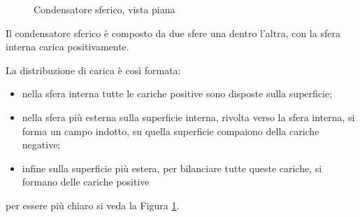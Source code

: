 \begin{figure}[H]
    \centering
    \caption{Condensatore sferico, vista piana}
    \label{fig:conSfera}
\end{figure}

Il condensatore sferico è composto da due sfere una dentro l'altra, con la sfera interna carica positivamente.

La distribuzione di carica è così formata:
\begin{itemize}
    \item nella sfera interna tutte le cariche positive sono disposte sulla superficie;
    \item nella sfera più esterna sulla superficie interna, rivolta verso la sfera interna, si forma un campo indotto, su quella superficie compaiono della cariche negative;
    \item infine sulla superficie più estera, per bilanciare tutte queste cariche, si formano delle cariche positive
\end{itemize}

per essere più chiaro si veda la Figura \ref{fig:conSfera}.

\paragraph{}



